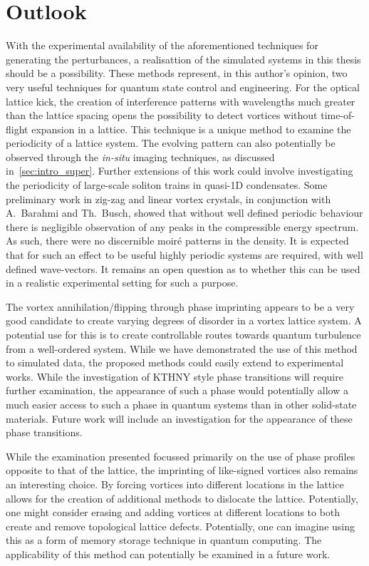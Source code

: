 \section{Outlook}


With the experimental availability of the aforementioned techniques for generating the perturbances, a realisattion of the simulated systems in this thesis should be a possibility. These methods represent, in this author's opinion, two very useful techniques for quantum state control and engineering. For the optical lattice kick, the creation of interference patterns with wavelengths much greater than the lattice spacing opens the possibility to detect vortices without time-of-flight expansion in a lattice. This technique is a unique method to examine the periodicity of a lattice system. The evolving pattern can also potentially be observed through the \textit{in-situ} imaging techniques, as discussed in~\ref{sec:intro_super}. Further extensions of this work could involve investigating the periodicity of large-scale soliton trains in quasi-1D condensates. Some preliminary work in zig-zag and linear vortex crystals, in conjunction with A.~Barahmi and Th.~Busch, showed that without well defined periodic behaviour there is negligible observation of any peaks in the compressible energy spectrum. As such, there were no discernible moir\'e patterns in the density. It is expected that for such an effect to be useful highly periodic systems are required, with well defined wave-vectors. It remains an open question as to whether this can be used in a realistic experimental setting for such a purpose.

The vortex annihilation/flipping through phase imprinting appears to be a very good candidate to create varying degrees of disorder in a vortex lattice system. A potential use for this is to create controllable routes towards quantum turbulence from a well-ordered system. While we have demonstrated the use of this method to simulated data, the proposed methods could easily extend to experimental works. While the investigation of KTHNY style phase transitions will require further examination, the appearance of such a phase would potentially allow a much easier access to such a phase in quantum systems than in other solid-state materials. Future work will include an investigation for the appearance of these phase transitions.

While the examination presented focussed primarily on the use of phase profiles opposite to that of the lattice, the imprinting of like-signed vortices also remains an interesting choice. By forcing vortices into different locations in the lattice allows for the creation of additional methods to dislocate the lattice. Potentially, one might consider erasing and adding vortices at different locations to both create and remove topological lattice defects. Potentially, one can imagine using this as a form of memory storage technique in quantum computing. The applicability of this method can potentially be examined in a future work.

